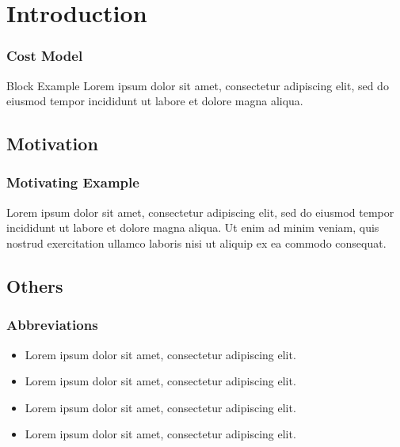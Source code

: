 
\section{Introduction}

\begin{frame}
    \frametitle{Cost Model}

    \begin{block}{Block Example}
        Lorem ipsum dolor sit amet, consectetur adipiscing elit, sed do eiusmod tempor incididunt ut labore et dolore magna aliqua.
    \end{block}

\end{frame}


\subsection{Motivation}

\begin{frame}
    \frametitle{Motivating Example}

    Lorem ipsum dolor sit amet, consectetur adipiscing elit, sed do eiusmod tempor incididunt ut labore et dolore magna aliqua. Ut enim ad minim veniam, quis nostrud exercitation ullamco laboris nisi ut aliquip ex ea commodo consequat.

\end{frame}


\subsection{Others}


\begin{frame}
    \frametitle{Abbreviations}

    \begin{itemize}
        \item Lorem ipsum dolor sit amet, consectetur adipiscing elit.
        \item Lorem ipsum dolor sit amet, consectetur adipiscing elit.
        \item Lorem ipsum dolor sit amet, consectetur adipiscing elit.
        \item Lorem ipsum dolor sit amet, consectetur adipiscing elit.
    \end{itemize}

\end{frame}


